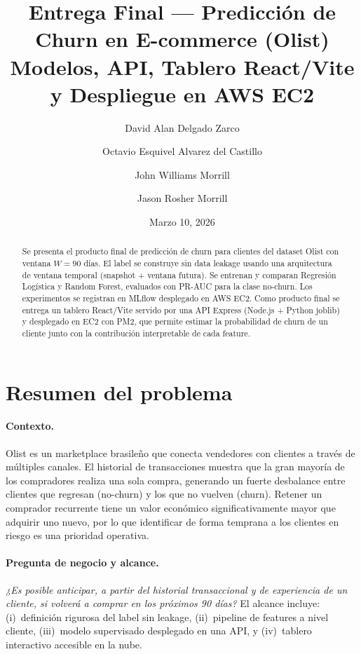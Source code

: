 \documentclass[11pt]{article}
\title{Entrega Final --- Predicción de Churn en E-commerce (Olist)\\
\large Modelos, API, Tablero React/Vite y Despliegue en AWS EC2}
\author{
David Alan Delgado Zarco \and
Octavio Esquivel Alvarez del Castillo \and
John Williams Morrill \and
Jason Rosher Morrill
}
\date{Marzo 10, 2026}
\begin{document}
\maketitle

\begin{abstract}
Se presenta el producto final de predicción de churn para clientes del dataset
Olist con ventana $W{=}90$ días. El label se construye sin data leakage usando
una arquitectura de ventana temporal (snapshot + ventana futura). Se entrenan y
comparan Regresión Logística y Random Forest, evaluados con PR-AUC para la
clase no-churn. Los experimentos se registran en MLflow desplegado en AWS EC2.
Como producto final se entrega un tablero React/Vite servido por una API Express
(Node.js + Python joblib) y desplegado en EC2 con PM2, que permite estimar la
probabilidad de churn de un cliente junto con la contribución interpretable de cada feature.
\end{abstract}

\section{Resumen del problema}

\paragraph{Contexto.}
Olist es un marketplace brasileño que conecta vendedores con clientes a través
de múltiples canales. El historial de transacciones muestra que la gran mayoría
de los compradores realiza una sola compra, generando un fuerte desbalance entre
clientes que regresan (no-churn) y los que no vuelven (churn). Retener un
comprador recurrente tiene un valor económico significativamente mayor que
adquirir uno nuevo, por lo que identificar de forma temprana a los clientes en
riesgo es una prioridad operativa.

\paragraph{Pregunta de negocio y alcance.}
\textit{¿Es posible anticipar, a partir del historial transaccional y de
experiencia de un cliente, si volverá a comprar en los próximos 90 días?}
El alcance incluye: (i)~definición rigurosa del label sin leakage, (ii)~pipeline
de features a nivel cliente, (iii)~modelo supervisado desplegado en una API, y
(iv)~tablero interactivo accesible en la nube.
\end{document}
